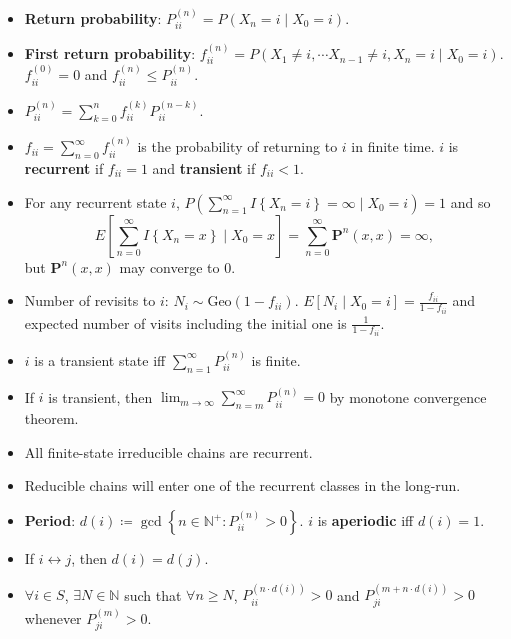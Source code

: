 \documentclass[10pt]{article}
\begin{document}
\begin{multicols*}{2}
\begin{itemize}
            \item \textbf{Return probability}: $P_{ii}^{\left(n\right)} = P\left(X_n = i \mid X_0 = i\right)$.
            \item \textbf{First return probability}: $f_{ii}^{\left(n\right)} = P\left(X_1 \neq i, \cdots X_{n - 1} \neq i, X_n = i \mid X_0 = i\right)$. $f_{ii}^{\left(0\right)} = 0$ and $f_{ii}^{\left(n\right)} \leq P_{ii}^{\left(n\right)}$.
            \item $P_{ii}^{\left(n\right)} = \sum_{k = 0}^{n}f_{ii}^{\left(k\right)}P_{ii}^{\left(n - k\right)}$.
            \item $f_{ii} = \sum_{n = 0}^{\infty}f_{ii}^{\left(n\right)}$ is the probability of returning to $i$ in finite time. $i$ is \textbf{recurrent} if $f_{ii} = 1$ and \textbf{transient} if $f_{ii} < 1$.
            \item For any recurrent state $i$, $P\left(\sum_{n = 1}^{\infty}I\left\{X_n = i\right\} = \infty \mid X_0 = i\right) = 1$ and so 
            \begin{equation*}
                E\left[\sum_{n = 0}^{\infty}I{\left\{X_n = x\right\}} \mid X_0 = x\right] = \sum_{n = 0}^{\infty}\bm{P}^n\left(x, x\right) = \infty,
            \end{equation*}
            but $\bm{P}^n\left(x, x\right)$ may converge to $0$.
            \item Number of revisits to $i$: $N_i \sim \mathrm{Geo}\left(1 - f_{ii}\right)$. $E\left[N_i \mid X_0 = i\right] = \frac{f_{ii}}{1 - f_{ii}}$ and expected number of visits including the initial one is $\frac{1}{1 - f_{ii}}$.
            \item $i$ is a transient state iff $\sum_{n = 1}^{\infty}P_{ii}^{\left(n\right)}$ is finite.
            \item If $i$ is transient, then $\lim_{m \to \infty}\sum_{n = m}^{\infty}P_{ii}^{\left(n\right)} = 0$ by monotone convergence theorem.
            \item All finite-state irreducible chains are recurrent.
            \item Reducible chains will enter one of the recurrent classes in the long-run.
            \item \textbf{Period}: $d\left(i\right) \coloneqq \gcd\left\{n \in \mathbb{N}^+ \colon P_{ii}^{\left(n\right)} > 0\right\}$. $i$ is \textbf{aperiodic} iff $d\left(i\right) = 1$.
            \item If $i \leftrightarrow j$, then $d\left(i\right) = d\left(j\right)$.
            \item $\forall i \in S$, $\exists N \in \mathbb{N}$ such that $\forall n \geq N$, $P_{ii}^{\left(n \cdot d\left(i\right)\right)} > 0$ and $P_{ji}^{\left(m + n \cdot d\left(i\right)\right)} > 0$ whenever $P_{ji}^{\left(m\right)} > 0$.

\end{itemize}
\end{multicols*}
\end{document}
